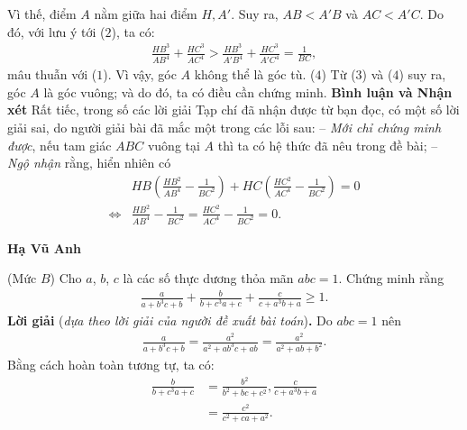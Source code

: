 \begin{multicols}{2}
	Vì thế, điểm $A$ nằm giữa hai điểm $H, A'$. Suy ra, $AB < A'B$ và $AC < A'C$.  Do đó, với lưu ý tới ($2$), ta có:
	\begin{align*}
		\frac{{H{B^3}}}{{A{B^4}}} + \frac{{H{C^3}}}{{A{C^4}}} > \frac{{H{B^3}}}{{A'{B^4}}} + \frac{{H{C^3}}}{{A'{C^4}}} = \frac{1}{{BC}},
	\end{align*}
	mâu thuẫn với ($1$). Vì vậy, góc $A$ không thể là góc tù.  \hfill ($4$)
	\vskip 0.05cm
	Từ ($3$) và ($4$) suy ra, góc $A$ là góc vuông; và do đó, ta có điều cần chứng minh.
	\vskip 0.05cm
	\textbf{\color{thachthuctoanhoc}Bình luận và Nhận xét}
	\vskip 0.05cm
	Rất tiếc, trong số các lời giải Tạp chí đã nhận được từ bạn đọc, có một số lời giải sai, do người giải bài đã mắc một trong các lỗi sau:
	\vskip 0.05cm
	-- \textit{Mới chỉ chứng minh được}, nếu tam giác $ABC$ vuông tại $A$ thì ta có hệ thức đã nêu trong đề bài;
	\vskip 0.05cm
	-- \textit{Ngộ nhận} rằng, hiển nhiên có
	\begin{align*}
		&HB\!\left(\!\!\frac{{H{B^2}}}{{A{B^4}}} \!-\! \frac{1}{{B{C^2}}}\!\! \right)\!\!+\! HC \! \left( \!\!\frac{{H{C^2}}}{{A{C^4}}} \!-\! \frac{1}{{B{C^2}}} \!\!\right) \!\!=\! 0\\
		\Leftrightarrow &\frac{{H{B^2}}}{{A{B^4}}} - \frac{1}{{B{C^2}}} = \frac{{H{C^2}}}{{A{C^4}}} - \frac{1}{{B{C^2}}} = 0.
	\end{align*}
	\begin{flushright}
		\textbf{\color{thachthuctoanhoc}Hạ Vũ Anh}
	\end{flushright}
	{}
	(Mức $B$)
	Cho $a$, $b$, $c$ là các số thực dương thỏa mãn $abc = 1$. Chứng minh rằng
	\begin{align*}
		\frac{a}{{a + {b^3}c + b}} \!+\! \frac{b}{{b + {c^3}a + c}} \!+\! \frac{c}{{c + {a^3}b + a}} \!\ge\! 1.
	\end{align*}
	\textbf{\color{thachthuctoanhoc}Lời giải} (\textit{dựa theo lời giải của người đề xuất bài toán})\textbf{\color{thachthuctoanhoc}.}
	\vskip 0.05cm
	Do $abc = 1$ nên
	\begin{align*}
		\frac{a}{{a \!+\! {b^3}c \!+\! b}} \!=\! \frac{{{a^2}}}{{{a^2} \!+\! a{b^3}c \!+\! ab}} \!=\! \frac{{{a^2}}}{{{a^2} \!+\! ab \!+\! {b^2}}}.
	\end{align*}
	Bằng cách hoàn toàn tương tự, ta có:
	\begin{align*}
		\frac{b}{{b + {c^3}a + c}} &= \frac{{{b^2}}}{{{b^2} + bc + {c^2}}}, \frac{c}{{c + {a^3}b + a}} \\
		&= \frac{{{c^2}}}{{{c^2} + ca + {a^2}}}.

\end{align*}
\end{multicols}

